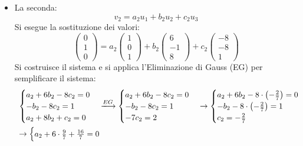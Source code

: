 \documentclass[a4paper]{article}
\begin{document}
\begin{itemize}
		\item La seconda:
		\begin{equation*}
			v_{2} = a_{2} u_{1} + b_{2} u_{2} + c_{2} u_{3}
		\end{equation*}
		Si esegue la sostituzione dei valori:
		\begin{equation*}
			\begin{pmatrix}
				0 \\ 1 \\ 0
			\end{pmatrix} =
			a_{2} \begin{pmatrix}
				1 \\ 0 \\ 1
			\end{pmatrix} +
			b_{2} \begin{pmatrix}
				6 \\ -1 \\ 8
			\end{pmatrix} +
			c_{2} \begin{pmatrix}
				-8 \\ -8 \\ 1
			\end{pmatrix}
		\end{equation*}
		Si costruisce il sistema e si applica l'Eliminazione di Gauss (EG) per semplificare il sistema:
		\begin{equation*}
			\begin{array}{l}
				\begin{cases}
					a_{2} + 6b_{2} - 8c_{2} = 0 \\
					-b_{2} - 8c_{2} = 1 \\
					a_{2} + 8b_{2} + c_{2} = 0
				\end{cases} \xlongrightarrow{EG}
				\begin{cases}
					a_{2} + 6b_{2} - 8c_{2} = 0 \\
					-b_{2} - 8c_{2} = 1 \\
					-7c_{2} = 2
				\end{cases} \rightarrow
				\begin{cases}
					a_{2} + 6b_{2} - 8 \cdot \left(-\frac{2}{7}\right) = 0 \\
					-b_{2} - 8 \cdot \left(-\frac{2}{7}\right) = 1 \\
					c_{2} = -\frac{2}{7}
				\end{cases} \\ [2em]
				\rightarrow \begin{cases}
					a_{2} + 6 \cdot \frac{9}{7} + \frac{16}{7} = 0 \\

\end{cases}
\end{array}
\end{equation*}
\end{itemize}
\end{document}
